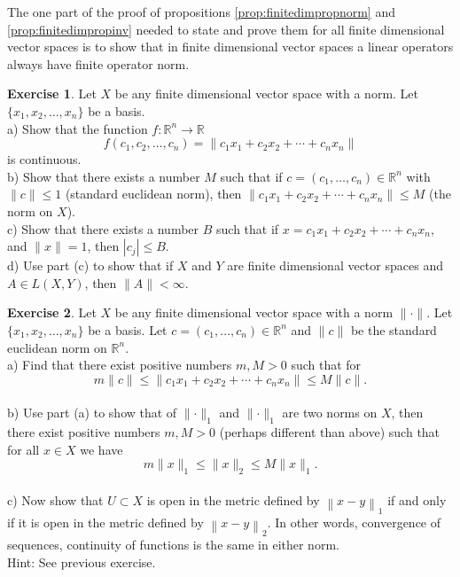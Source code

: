 \documentclass[12pt]{book}
\newcommand{\snorm}[1]{\lVert {#1} \rVert}
\newcommand{\abs}[1]{\left\lvert {#1} \right\rvert}
\newcommand{\norm}[1]{\left\lVert {#1} \right\rVert}
\newcommand{\R}{{\mathbb{R}}}
\theoremstyle{plain}
\theoremstyle{remark}
\theoremstyle{definition}
\newenvironment{exnote}{\small}{}
\theoremstyle{exercise}
\newtheorem{exercise}{Exercise}[section]
\theoremstyle{example}
\begin{document}
\begin{exnote}
The one part of the proof of propositions \ref{prop:finitedimpropnorm} and
\ref{prop:finitedimpropinv} needed to state and prove them for all
finite dimensional vector spaces is to show that in finite dimensional
vector spaces a linear operators always have finite operator norm.
\end{exnote}

\begin{exercise}
Let $X$ be any finite dimensional vector space with a norm.  Let $\{ x_1,x_2,\ldots,x_n
\}$ be a basis. \\
a) Show that the function $f \colon \R^n \to \R$
\begin{equation*}
f(c_1,c_2,\ldots,c_n) = 
\snorm{c_1 x_1 + c_2 x_2 + \cdots + c_n x_n}
\end{equation*}
is continuous.
\\
b) Show that there exists a number $M$ such
that if $c = (c_1,\ldots,c_n) \in \R^n$ with
$\snorm{c} \leq 1$ (standard euclidean norm), then 
$\snorm{c_1 x_1 + c_2 x_2 + \cdots + c_n x_n} \leq M$ (the norm on $X$).
\\
c) Show that there exists a number $B$ such that if
$x = c_1 x_1 + c_2 x_2 + \cdots + c_n x_n$, and $\snorm{x} = 1$,
then $\abs{c_j} \leq B$.
\\
d) Use part (c) to show that if $X$ and $Y$ are finite dimensional vector 
spaces and $A \in L(X,Y)$, then $\snorm{A} < \infty$.
\end{exercise}

\begin{exercise}
Let $X$ be any finite dimensional vector space with a norm $\snorm{\cdot}$.  Let $\{ x_1,x_2,\ldots,x_n
\}$ be a basis.  Let $c = (c_1,\ldots,c_n) \in \R^n$ and $\snorm{c}$ be the
standard euclidean norm on $\R^n$.
\\
a) Find that there exist positive numbers $m,M > 0$ such that
for 
\begin{equation*}
m \snorm{c}
\leq
\snorm{c_1 x_1 + c_2 x_2 + \cdots + c_n x_n}
\leq
M \snorm{c} .
\end{equation*}
\\
b) Use part (a) to show that of
$\snorm{\cdot}_1$ and
$\snorm{\cdot}_1$ are two norms on $X$, then there exist positive
numbers $m,M > 0$ (perhaps different than above) such that
for all $x \in X$ we have
\begin{equation*}
m \snorm{x}_1
\leq
\snorm{x}_2
\leq
M \snorm{x}_1 .
\end{equation*}
\\
c) Now show that $U \subset X$ is open in the metric defined by
$\norm{x-y}_1$ if and only if it is open in the metric defined by
$\norm{x-y}_2$.  In other words, convergence of sequences, continuity
of functions is the same in either norm.
\\
Hint: See previous exercise.
\end{exercise}
\end{document}
